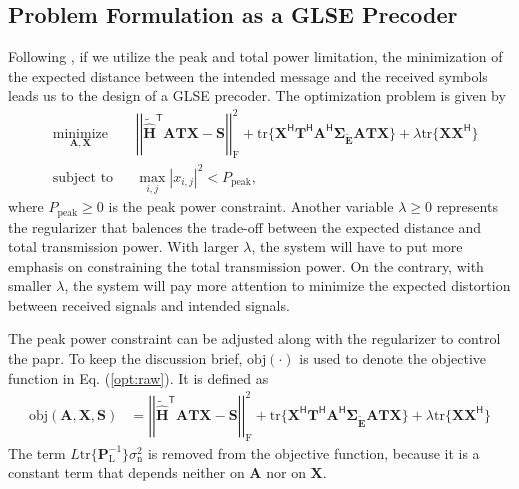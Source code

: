 \documentclass[12pt,draftclsnofoot,onecolumn,journal]{IEEEtran}
\begin{document}
\subsection{Problem Formulation as a GLSE Precoder}
Following \cite{glse}, if we utilize the peak and total power limitation, the minimization of the expected distance between the intended message and the received symbols leads us to the design of a GLSE precoder. The optimization problem is given by
\begin{equation}
\begin{aligned}
& \underset{\mathbf A, \mathbf X}{\text{minimize}}
& &\left|\left|\tilde{\hat{\mathbf H}}^{\mathsf T}\mathbf{ATX}-\mathbf{S}\right|\right|_{\mathrm{F}}^2+\mathrm{tr}\{\mathbf X^{\mathsf H}\mathbf T^{\mathsf H}\mathbf A^{\mathsf H}
\pmb{\Sigma_{\tilde{\mathbf E}}}\mathbf{ATX}\}+\lambda\mathrm{tr}\{\mathbf X\mathbf X^{\mathsf H}\}\\
& \text{subject to}
& &\max_{i,j} |x_{i,j}|^2<P_{\mathrm{peak}},
\label{opt:raw}
\end{aligned}
\end{equation}
where $P_{\mathrm{peak}}\geq 0$ is the peak power constraint. Another variable $\lambda\geq 0$ represents the regularizer that balences the trade-off between the expected distance and total transmission power. With larger $\lambda$, the system will have to put more emphasis on constraining the total transmission power. On the contrary, with smaller $\lambda$, the system will pay more attention to minimize the expected distortion between received signals and intended signals. 

The peak power constraint can be adjusted along with the regularizer to control the \ac{papr}.
To keep the discussion brief, $\mathrm{obj}(\cdot)$ is used to denote the objective function in Eq. (\ref{opt:raw}). It is defined as
\begin{equation}
\begin{split}
\mathrm{obj}(\mathbf A, \mathbf X, \mathbf S)&=\left|\left|\tilde{\hat{\mathbf H}}^{\mathsf T}\mathbf{ATX}-\mathbf{S}\right|\right|_{\mathrm{F}}^2+\mathrm{tr}\{\mathbf X^{\mathsf H}\mathbf T^{\mathsf H}\mathbf A^{\mathsf H}
\pmb{\Sigma_{\tilde{\mathbf E}}}\mathbf{ATX}\}+\lambda\mathrm{tr}\{\mathbf X\mathbf X^{\mathsf H}\}
\label{eq:objfunc}
\end{split}
\end{equation}
The term $L\mathrm{tr}\{\mathbf P_{\mathrm L}^{-1}\}\sigma_{\mathrm n}^2$ is removed from the objective function, because it is a constant term that depends neither on $\mathbf A$ nor on $\mathbf X$.
\end{document}
